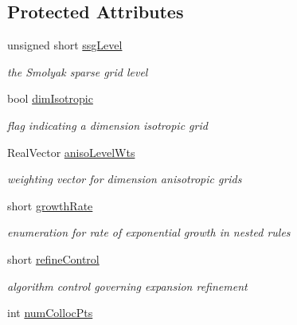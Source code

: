 \subsection*{Protected Attributes}
\begin{DoxyCompactItemize}
\item 
unsigned short \hyperlink{classPecos_1_1SparseGridDriver_ae0aa3ff9465ed992c8f40f6304bd158f}{ssg\+Level}\label{classPecos_1_1SparseGridDriver_ae0aa3ff9465ed992c8f40f6304bd158f}

\begin{DoxyCompactList}\small\item\em the Smolyak sparse grid level \end{DoxyCompactList}\item 
bool \hyperlink{classPecos_1_1SparseGridDriver_a4aa1a8d08830ebf9ed75430f2bc0c1ee}{dim\+Isotropic}\label{classPecos_1_1SparseGridDriver_a4aa1a8d08830ebf9ed75430f2bc0c1ee}

\begin{DoxyCompactList}\small\item\em flag indicating a dimension isotropic grid \end{DoxyCompactList}\item 
Real\+Vector \hyperlink{classPecos_1_1SparseGridDriver_a6fcaa7134c18987eefbe231a1dc9c72c}{aniso\+Level\+Wts}\label{classPecos_1_1SparseGridDriver_a6fcaa7134c18987eefbe231a1dc9c72c}

\begin{DoxyCompactList}\small\item\em weighting vector for dimension anisotropic grids \end{DoxyCompactList}\item 
short \hyperlink{classPecos_1_1SparseGridDriver_a0eb98f47912c9fc23b15eaee119edb35}{growth\+Rate}\label{classPecos_1_1SparseGridDriver_a0eb98f47912c9fc23b15eaee119edb35}

\begin{DoxyCompactList}\small\item\em enumeration for rate of exponential growth in nested rules \end{DoxyCompactList}\item 
short \hyperlink{classPecos_1_1SparseGridDriver_aeb19c20b1c993a64aa38c9d768de15fe}{refine\+Control}\label{classPecos_1_1SparseGridDriver_aeb19c20b1c993a64aa38c9d768de15fe}

\begin{DoxyCompactList}\small\item\em algorithm control governing expansion refinement \end{DoxyCompactList}\item 
int \hyperlink{classPecos_1_1SparseGridDriver_a48995f5f4c2c3d6cca97f685b8d01ce1}{num\+Colloc\+Pts}\label{classPecos_1_1SparseGridDriver_a48995f5f4c2c3d6cca97f685b8d01ce1}


\end{DoxyCompactItemize}
